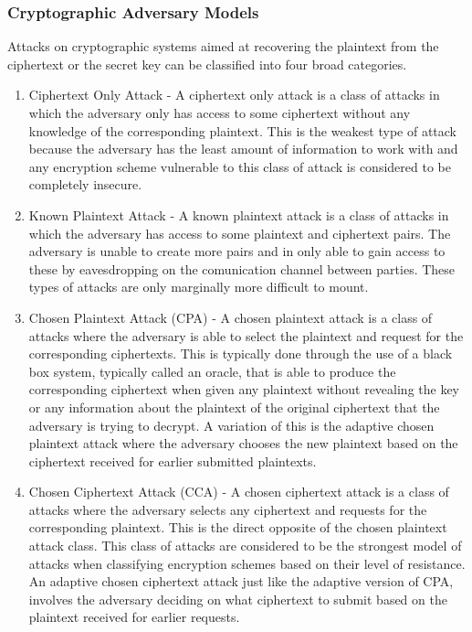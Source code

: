 \subsubsection*{Cryptographic Adversary Models}

Attacks on cryptographic systems aimed at recovering the plaintext from the ciphertext or the secret key can be classified into four broad categories.

\begin{enumerate}[label=(\arabic*)]
	\item Ciphertext Only Attack \cite{Menezes1996} - A ciphertext only attack is a class of attacks in which the adversary only has access to some ciphertext without any knowledge of the corresponding plaintext. This is the weakest type of attack because the adversary has the least amount of information to work with and any encryption scheme vulnerable to this class of attack is considered to be completely insecure.
	
	\item Known Plaintext Attack \cite{Menezes1996} - A known plaintext attack is a class of attacks in which the adversary has access to some plaintext and ciphertext pairs. The  adversary is unable to create more pairs and in only able to gain access to these by eavesdropping on the comunication channel between parties. These types of attacks are only marginally more difficult to mount. 
	
	\item Chosen Plaintext Attack (CPA) \cite{Menezes1996} - A chosen plaintext attack is a class of attacks where the adversary is able to select the plaintext and request for the corresponding ciphertexts. This is typically done through the use of a black box system, typically called an oracle, that is able to produce the corresponding ciphertext when given any plaintext without revealing the key or any information about the plaintext of the original ciphertext that the adversary is trying to decrypt. A variation of this is the adaptive chosen plaintext attack where the adversary chooses the new plaintext based on the ciphertext received for earlier submitted plaintexts.
	
	\item Chosen Ciphertext Attack (CCA) \cite{Menezes1996} - A chosen ciphertext attack is a class of attacks where the adversary selects any ciphertext and requests for the corresponding plaintext. This is the direct opposite of the chosen plaintext attack class. This class of attacks are considered to be the strongest model of attacks when classifying encryption schemes based on their level of resistance. An adaptive chosen ciphertext attack just like the adaptive version of CPA, involves the adversary deciding on what ciphertext to submit based on the plaintext received for earlier requests.
	
\end{enumerate}

